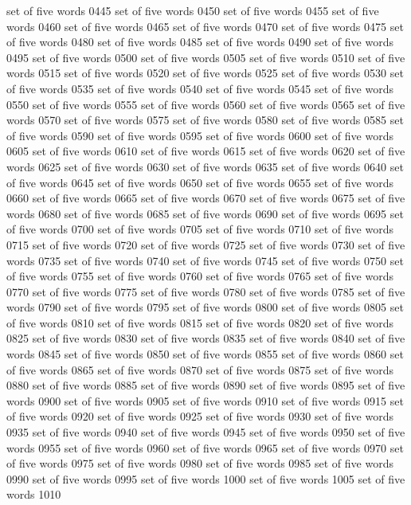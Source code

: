 set	of	five	words	0445
set	of	five	words	0450
set	of	five	words	0455
set	of	five	words	0460
set	of	five	words	0465
set	of	five	words	0470
set	of	five	words	0475
set	of	five	words	0480
set	of	five	words	0485
set	of	five	words	0490
set	of	five	words	0495
set	of	five	words	0500
set	of	five	words	0505
set	of	five	words	0510
set	of	five	words	0515
set	of	five	words	0520
set	of	five	words	0525
set	of	five	words	0530
set	of	five	words	0535
set	of	five	words	0540
set	of	five	words	0545
set	of	five	words	0550
set	of	five	words	0555
set	of	five	words	0560
set	of	five	words	0565
set	of	five	words	0570
set	of	five	words	0575
set	of	five	words	0580
set	of	five	words	0585
set	of	five	words	0590
set	of	five	words	0595
set	of	five	words	0600
set	of	five	words	0605
set	of	five	words	0610
set	of	five	words	0615
set	of	five	words	0620
set	of	five	words	0625
set	of	five	words	0630
set	of	five	words	0635
set	of	five	words	0640
set	of	five	words	0645
set	of	five	words	0650
set	of	five	words	0655
set	of	five	words	0660
set	of	five	words	0665
set	of	five	words	0670
set	of	five	words	0675
set	of	five	words	0680
set	of	five	words	0685
set	of	five	words	0690
set	of	five	words	0695
set	of	five	words	0700
set	of	five	words	0705
set	of	five	words	0710
set	of	five	words	0715
set	of	five	words	0720
set	of	five	words	0725
set	of	five	words	0730
set	of	five	words	0735
set	of	five	words	0740
set	of	five	words	0745
set	of	five	words	0750
set	of	five	words	0755
set	of	five	words	0760
set	of	five	words	0765
set	of	five	words	0770
set	of	five	words	0775
set	of	five	words	0780
set	of	five	words	0785
set	of	five	words	0790
set	of	five	words	0795
set	of	five	words	0800
set	of	five	words	0805
set	of	five	words	0810
set	of	five	words	0815
set	of	five	words	0820
set	of	five	words	0825
set	of	five	words	0830
set	of	five	words	0835
set	of	five	words	0840
set	of	five	words	0845
set	of	five	words	0850
set	of	five	words	0855
set	of	five	words	0860
set	of	five	words	0865
set	of	five	words	0870
set	of	five	words	0875
set	of	five	words	0880
set	of	five	words	0885
set	of	five	words	0890
set	of	five	words	0895
set	of	five	words	0900
set	of	five	words	0905
set	of	five	words	0910
set	of	five	words	0915
set	of	five	words	0920
set	of	five	words	0925
set	of	five	words	0930
set	of	five	words	0935
set	of	five	words	0940
set	of	five	words	0945
set	of	five	words	0950
set	of	five	words	0955
set	of	five	words	0960
set	of	five	words	0965
set	of	five	words	0970
set	of	five	words	0975
set	of	five	words	0980
set	of	five	words	0985
set	of	five	words	0990
set	of	five	words	0995
set	of	five	words	1000
set	of	five	words	1005
set	of	five	words	1010
